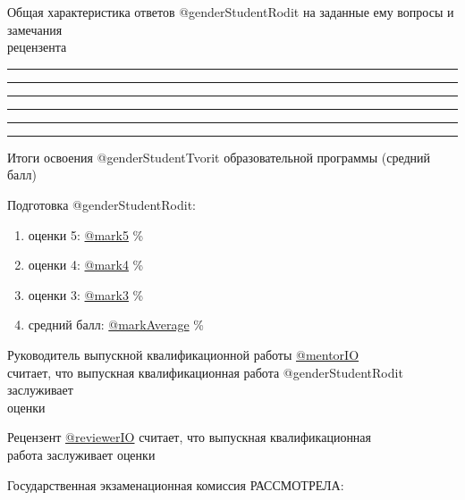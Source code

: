 \documentclass[a4paper,12pt]{article} %
\begin{document}
\pagebreak

\hfill \break
\hfill \break
\thispagestyle{empty}
 
	Общая характеристика ответов @genderStudentRodit на заданные ему вопросы и замечания\\ рецензента  
	\vspace{0.4cm}
	\smallskip\hrule
	\vspace{0.4cm} 
	\smallskip\hrule
	\vspace{0.4cm} 
	\smallskip\hrule
	\vspace{0.4cm} 
	\smallskip\hrule
	\vspace{0.4cm} 
	\smallskip\hrule
	\vspace{0.4cm} 
	\smallskip\hrule
	\vspace{0.4cm} 

\par\medskip
Итоги освоения @genderStudentTvorit образовательной программы (средний балл)

Подготовка @genderStudentRodit:
\vspace{-0.2cm}
\begin{enumerate}
	\item оценки 5: \underline{@mark5} \%
	\vspace{-0.35cm}
	\item оценки 4: \underline{@mark4} \%
	\vspace{-0.35cm}
	\item оценки 3: \underline{@mark3} \%
	\vspace{-0.35cm}
	\item средний балл: \underline{@markAverage} \%
	\vspace{-0.35cm}
\end{enumerate}
\par\bigskip
Руководитель выпускной квалификационной работы 
\underline{@mentorIO}\\
считает, что выпускная квалификационная работа @genderStudentRodit заслуживает \\
оценки  \makebox[10mm]{\hrulefill}\makebox[10mm]{\hrulefill}\makebox[10mm]{\hrulefill}
\par\medskip
Рецензент \underline{@reviewerIO} считает, что выпускная квалификационная\\ работа заслуживает оценки \makebox[10mm]{\hrulefill}\makebox[10mm]{\hrulefill}\makebox[10mm]{\hrulefill}
\par\medskip

Государственная экзаменационная комиссия РАССМОТРЕЛА:
\end{document}
